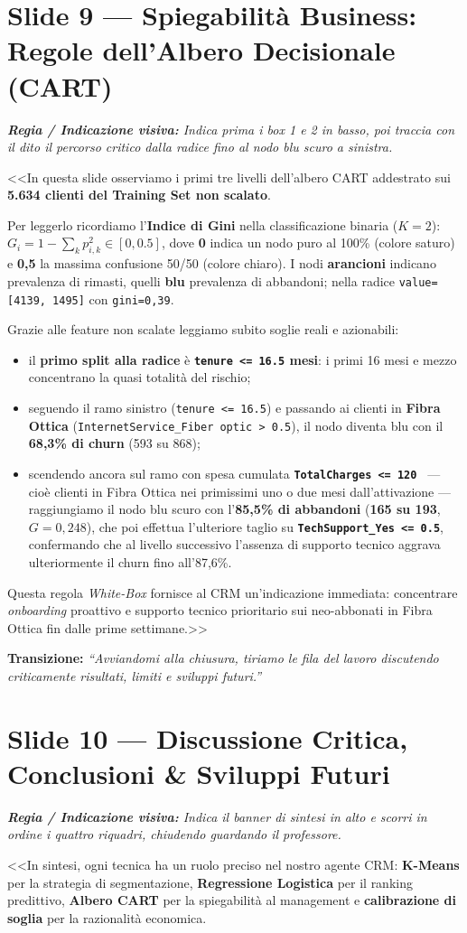 \documentclass[10pt, a4paper]{article}
\newcommand{\cue}[1]{%
  \par\vspace{2pt}\noindent\colorbox{CueBg}{\parbox{\dimexpr\linewidth-2\fboxsep}{\footnotesize\textit{\color{PrimaryNavy}\textbf{Regia / Indicazione visiva:} #1}}}\par\vspace{3pt}%
}
\newcommand{\transition}[1]{%
  \par\vspace{2pt}\noindent\colorbox{LightBg}{\parbox{\dimexpr\linewidth-2\fboxsep}{\small\textbf{\color{SecondaryBlue}Transizione:} \textit{``#1''}}}\par\vspace{4pt}%
}
\begin{document}
\section*{Slide 9 --- Spiegabilità Business: Regole dell'Albero Decisionale (CART)}
\cue{Indica prima i box 1 e 2 in basso, poi traccia con il dito il percorso critico dalla radice fino al nodo blu scuro a sinistra.}
\noindent <<In questa slide osserviamo i primi tre livelli dell'albero CART addestrato sui \textbf{5.634 clienti del Training Set non scalato}.

Per leggerlo ricordiamo l'\textbf{Indice di Gini} nella classificazione binaria ($K=2$): $G_i = 1 - \sum_k p_{i,k}^2 \in [0, 0.5]$, dove \textbf{0} indica un nodo puro al 100\% (colore saturo) e \textbf{0,5} la massima confusione 50/50 (colore chiaro). I nodi \textbf{arancioni} indicano prevalenza di rimasti, quelli \textbf{blu} prevalenza di abbandoni; nella radice \texttt{value=[4139, 1495]} con \texttt{gini=0,39}.

Grazie alle feature non scalate leggiamo subito soglie reali e azionabili:
\begin{itemize}
    \item il \textbf{primo split alla radice} è \textbf{\texttt{tenure <= 16.5} mesi}: i primi 16 mesi e mezzo concentrano la quasi totalità del rischio;
    \item seguendo il ramo sinistro (\texttt{tenure <= 16.5}) e passando ai clienti in \textbf{Fibra Ottica} (\texttt{InternetService\_Fiber optic > 0.5}), il nodo diventa blu con il \textbf{68,3\% di churn} (593 su 868);
    \item scendendo ancora sul ramo con spesa cumulata \textbf{\texttt{TotalCharges <= 120\,\texteuro}} --- cioè clienti in Fibra Ottica nei primissimi uno o due mesi dall'attivazione --- raggiungiamo il nodo blu scuro con l'\textbf{85,5\% di abbandoni} (\textbf{165 su 193}, $G=0,248$), che poi effettua l'ulteriore taglio su \textbf{\texttt{TechSupport\_Yes <= 0.5}}, confermando che al livello successivo l'assenza di supporto tecnico aggrava ulteriormente il churn fino all'87,6\%.
\end{itemize}
Questa regola \textit{White-Box} fornisce al CRM un'indicazione immediata: concentrare \textit{onboarding} proattivo e supporto tecnico prioritario sui neo-abbonati in Fibra Ottica fin dalle prime settimane.>>
\transition{Avviandomi alla chiusura, tiriamo le fila del lavoro discutendo criticamente risultati, limiti e sviluppi futuri.}

\section*{Slide 10 --- Discussione Critica, Conclusioni \& Sviluppi Futuri}
\cue{Indica il banner di sintesi in alto e scorri in ordine i quattro riquadri, chiudendo guardando il professore.}
\noindent <<In sintesi, ogni tecnica ha un ruolo preciso nel nostro agente CRM: \textbf{K-Means} per la strategia di segmentazione, \textbf{Regressione Logistica} per il ranking predittivo, \textbf{Albero CART} per la spiegabilità al management e \textbf{calibrazione di soglia} per la razionalità economica.
\end{document}
